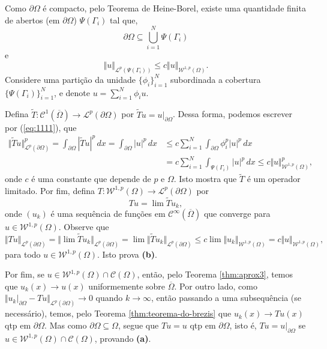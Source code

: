 \documentclass[a4paper, 11pt]{book}
\theoremstyle{definition}
\newcommand{\cC}{\mathcal{C}}
\newcommand{\cL}{\mathcal{L}}
\newcommand{\cW}{\mathcal{W}}
\begin{document}
\begin{prf}
    Como $\partial\Omega$ é compacto, pelo Teorema de Heine-Borel, existe uma quantidade finita de abertos (em $\partial \Omega$) $\Psi(\Gamma_i)$ tal que,
    \[
        \partial\Omega \subseteq \bigcup_{i=1}^N \Psi(\Gamma_i)
    \]
    e
    \begin{equation} \label{eq:1111}
        \Vert u \Vert_{\cL^p(\Psi(\Gamma_i))} \leqslant c \Vert u \Vert_{\cW^{1,p}(\Omega)}.
    \end{equation}
    Considere uma partição da unidade $\{\phi_i\}_{i=1}^N$ subordinada a cobertura $\{\Psi(\Gamma_i)\}_{i=1}^N$, e denote $u = \sum_{i=1}^N \phi_i u$.

    Defina $\widetilde T : \cC^1(\overline \Omega) \to \cL^p(\partial\Omega)$ por $\widetilde T u = u |_{\partial \Omega}$.
    Dessa forma, podemos escrever por (\ref{eq:1111}), que
    \begin{equation} \label{eq:2222}
        \begin{aligned}
            \Vert \widetilde Tu \Vert_{\cL^p(\partial \Omega)}^p = \int_{\partial\Omega} | \widetilde T u|^p \,dx = \int_{\partial\Omega} |u|^p \,dx &\leqslant c \sum_{i=1}^{N} \int_{\partial \Omega} \phi_i^p |u|^p \,dx\\ 
            &= c \sum_{i=1}^N \int_{\Psi(\Gamma_i)} |u|^p \,dx \leqslant c\Vert u \Vert_{\cW^{1,p}(\Omega)}^p,
        \end{aligned}
    \end{equation}
    onde $c$ é uma constante que depende de $p$ e $\Omega$. Isto mostra que $\widetilde T$ é um operador limitado.
    Por fim, defina $T : \cW^{1,p}(\Omega) \to \cL^p(\partial \Omega)$ por
    \[
        T u = \lim \widetilde T u_k,
    \]
    onde $(u_k)$ é uma sequência de funções em $\cC^{\infty}(\overline\Omega)$ que converge para $u \in \cW^{1,p}(\Omega)$. 
    Observe que
    \[
        \Vert Tu \Vert_{\cL^p(\partial \Omega)} = \Vert \lim \widetilde T u_k \Vert_{\cL^p(\partial \Omega)} = \lim \Vert \widetilde T u_k \Vert_{\cL^p(\partial \Omega)} \leqslant c \lim \Vert u_k \Vert_{\cW^{1,p}(\Omega)} = c \Vert u \Vert_{\cW^{1,p}(\Omega)},
    \]
    para todo $u \in \cW^{1,p}(\Omega)$. Isto prova \textbf{(b)}.

    Por fim, se $u \in \cW^{1,p}(\Omega) \cap \cC(\Omega)$, então, pelo Teorema \ref{thm:aprox3}, temos que $u_k(x) \to u(x)$ uniformemente sobre $\overline\Omega$.
    Por outro lado, como $\Vert u_k |_{\partial\Omega} - Tu \Vert_{\cL^p(\partial \Omega)} \to 0$ quando $k \to \infty$, então passando a uma subsequência (se necessário), temos, pelo Teorema \ref{thm:teorema-do-brezis} que $u_k(x) \to Tu(x)$ qtp em $\partial \Omega$.
    Mas como $\partial \Omega \subseteq \Omega$, segue que $Tu = u$ qtp em $\partial \Omega$, isto é, $Tu = u|_{\partial\Omega}$ se $u \in \cW^{1,p}(\Omega) \cap \cC(\Omega)$, provando \textbf{(a)}.
\end{prf}
\end{document}
